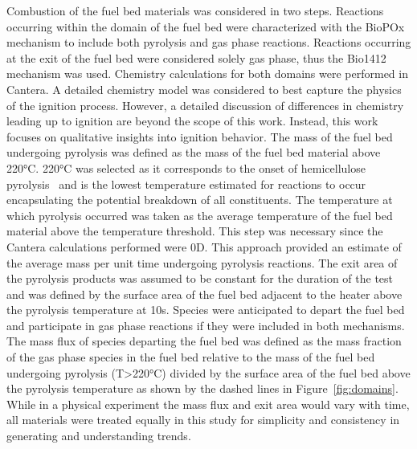     
     Combustion of the fuel bed materials was considered in two steps. Reactions occurring within the domain of the fuel bed were characterized with the BioPOx mechanism to include both pyrolysis and gas phase reactions. Reactions occurring at the exit of the fuel bed were considered solely gas phase, thus the Bio1412 mechanism was used. Chemistry calculations for both domains were performed in Cantera. A detailed chemistry model was considered to best capture the physics of the ignition process. However, a detailed discussion of differences in chemistry leading up to ignition are beyond the scope of this work. Instead, this work focuses on qualitative insights into ignition behavior. The mass of the fuel bed undergoing pyrolysis was defined as the mass of the fuel bed material above 220\si{\celsius}. 220\si{\celsius} was selected as it corresponds to the onset of hemicellulose pyrolysis~\cite{Yang2007} and is the lowest temperature estimated for reactions to occur encapsulating the potential breakdown of all constituents. The temperature at which pyrolysis occurred was taken as the average temperature of the fuel bed material above the temperature threshold. This step was necessary since the Cantera calculations performed were 0D. This approach provided an estimate of the average mass per unit time undergoing pyrolysis reactions. The exit area of the pyrolysis products was assumed to be constant for the duration of the test and was defined by the surface area of the fuel bed adjacent to the heater above the pyrolysis temperature at 10\si{\second}. Species were anticipated to depart the fuel bed and participate in gas phase reactions if they were included in both mechanisms. The mass flux of species departing the fuel bed was defined as the mass fraction of the gas phase species in the fuel bed relative to the mass of the fuel bed undergoing pyrolysis (T\textgreater220\si{\celsius}) divided by the surface area of the fuel bed above the pyrolysis temperature as shown by the dashed lines in Figure~\ref{fig:domains}. While in a physical experiment the mass flux and exit area would vary with time, all materials were treated equally in this study for simplicity and consistency in generating and understanding trends.
        
